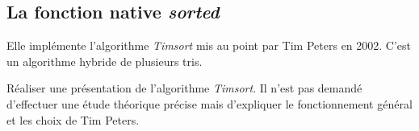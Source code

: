 \documentclass[a4paper,11pt]{article}
\begin{document}
\begin{Form}
\section{La fonction native \emph{sorted}}
Elle implémente l'algorithme \emph{Timsort} mis au point par Tim Peters en 2002. C'est un algorithme hybride de plusieurs tris.
\begin{activite}
Réaliser une présentation de l'algorithme \emph{Timsort}. Il n'est pas demandé d'effectuer une étude théorique précise mais d'expliquer le fonctionnement général et les choix de Tim Peters.
\end{activite}
\end{Form}
\end{document}
